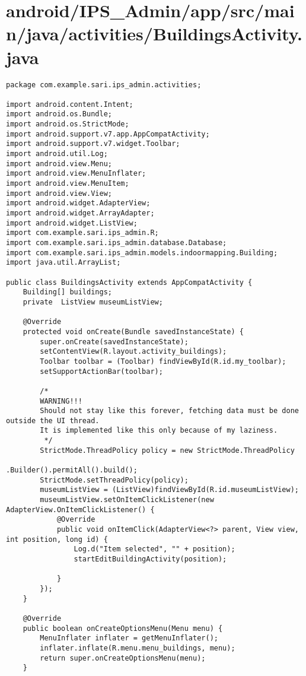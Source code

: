 \section{android/IPS\_Admin/app/src/main/java/activities/BuildingsActivity.java}
\begin{lstlisting}package com.example.sari.ips_admin.activities;

import android.content.Intent;
import android.os.Bundle;
import android.os.StrictMode;
import android.support.v7.app.AppCompatActivity;
import android.support.v7.widget.Toolbar;
import android.util.Log;
import android.view.Menu;
import android.view.MenuInflater;
import android.view.MenuItem;
import android.view.View;
import android.widget.AdapterView;
import android.widget.ArrayAdapter;
import android.widget.ListView;
import com.example.sari.ips_admin.R;
import com.example.sari.ips_admin.database.Database;
import com.example.sari.ips_admin.models.indoormapping.Building;
import java.util.ArrayList;

public class BuildingsActivity extends AppCompatActivity {
    Building[] buildings;
    private  ListView museumListView;

    @Override
    protected void onCreate(Bundle savedInstanceState) {
        super.onCreate(savedInstanceState);
        setContentView(R.layout.activity_buildings);
        Toolbar toolbar = (Toolbar) findViewById(R.id.my_toolbar);
        setSupportActionBar(toolbar);

        /*
        WARNING!!!
        Should not stay like this forever, fetching data must be done outside the UI thread.
        It is implemented like this only because of my laziness.
         */
        StrictMode.ThreadPolicy policy = new StrictMode.ThreadPolicy
                                        .Builder().permitAll().build();
        StrictMode.setThreadPolicy(policy);
        museumListView = (ListView)findViewById(R.id.museumListView);
        museumListView.setOnItemClickListener(new AdapterView.OnItemClickListener() {
            @Override
            public void onItemClick(AdapterView<?> parent, View view, int position, long id) {
                Log.d("Item selected", "" + position);
                startEditBuildingActivity(position);

            }
        });
    }

    @Override
    public boolean onCreateOptionsMenu(Menu menu) {
        MenuInflater inflater = getMenuInflater();
        inflater.inflate(R.menu.menu_buildings, menu);
        return super.onCreateOptionsMenu(menu);
    }


\end{lstlisting}
